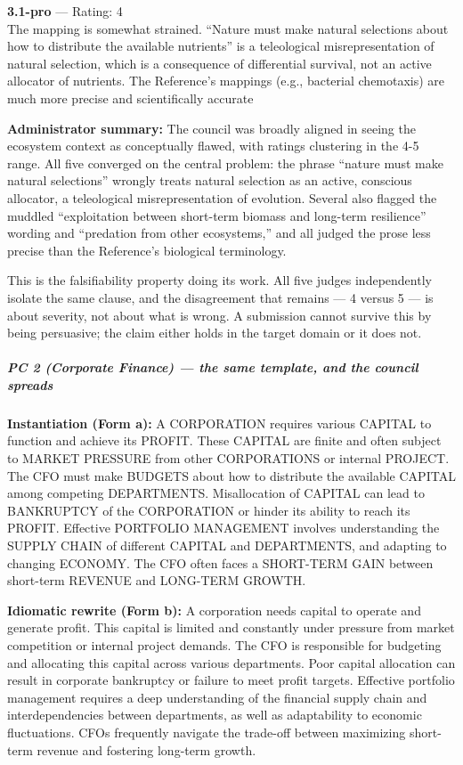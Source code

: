 \textbf{3.1-pro} --- Rating: 4\\
The mapping is somewhat strained. ``Nature must make natural selections about how to distribute the available nutrients'' is a teleological misrepresentation of natural selection, which is a consequence of differential survival, not an active allocator of nutrients. The Reference's mappings (e.g., bacterial chemotaxis) are much more precise and scientifically accurate

\textbf{Administrator summary:} The council was broadly aligned in seeing the ecosystem context as conceptually flawed, with ratings clustering in the 4-5 range. All five converged on the central problem: the phrase ``nature must make natural selections'' wrongly treats natural selection as an active, conscious allocator, a teleological misrepresentation of evolution. Several also flagged the muddled ``exploitation between short-term biomass and long-term resilience'' wording and ``predation from other ecosystems,'' and all judged the prose less precise than the Reference's biological terminology.

This is the falsifiability property doing its work. All five judges independently isolate the same clause, and the disagreement that remains --- 4 versus 5 --- is about severity, not about what is wrong. A submission cannot survive this by being persuasive; the claim either holds in the target domain or it does not.

\subparagraph{PC 2 (Corporate Finance) --- the same template, and the council spreads}\label{pc-2-corporate-finance-the-same-template-and-the-council-spreads}

\textbf{Instantiation (Form a):} A CORPORATION requires various CAPITAL to function and achieve its PROFIT. These CAPITAL are finite and often subject to MARKET PRESSURE from other CORPORATIONS or internal PROJECT. The CFO must make BUDGETS about how to distribute the available CAPITAL among competing DEPARTMENTS. Misallocation of CAPITAL can lead to BANKRUPTCY of the CORPORATION or hinder its ability to reach its PROFIT. Effective PORTFOLIO MANAGEMENT involves understanding the SUPPLY CHAIN of different CAPITAL and DEPARTMENTS, and adapting to changing ECONOMY. The CFO often faces a SHORT-TERM GAIN between short-term REVENUE and LONG-TERM GROWTH.

\textbf{Idiomatic rewrite (Form b):} A corporation needs capital to operate and generate profit. This capital is limited and constantly under pressure from market competition or internal project demands. The CFO is responsible for budgeting and allocating this capital across various departments. Poor capital allocation can result in corporate bankruptcy or failure to meet profit targets. Effective portfolio management requires a deep understanding of the financial supply chain and interdependencies between departments, as well as adaptability to economic fluctuations. CFOs frequently navigate the trade-off between maximizing short-term revenue and fostering long-term growth.

